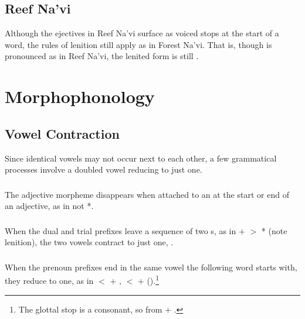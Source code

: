 
\subsection{Reef Na'vi} 
Although the ejectives in Reef Na'vi surface as voiced stops at the
start of a word, the rules of lenition still apply as in Forest Na'vi.
That is, though   is pronounced as  in Reef
Na'vi, the lenited form is still .

\section{Morphophonology}

\subsection{Vowel Contraction} Since identical vowels may not occur
next to each other, a few grammatical processes involve a doubled
vowel reducing to just one.\label{l-and-s:contract}

\subsubsection{} The adjective morpheme  disappears when
attached to an  at the start or end of an adjective, as in
 not *.

\subsubsection{} When the dual and trial prefixes leave a sequence of
two s, as in  $+$  $>$ * (note
lenition), the two vowels contract to just one, .
\label{l-and-s:phonotactics:nsc} 

\subsubsection{} When the prenoun prefixes end in the same vowel the
following word starts with, they reduce to one, as in  $<$
 $+$ ,  $<$  $+$ 
().\footnote{The glottal stop is a
consonant, so  from  $+$ .}
\label{l-and-s:phonotactics:precontract}


